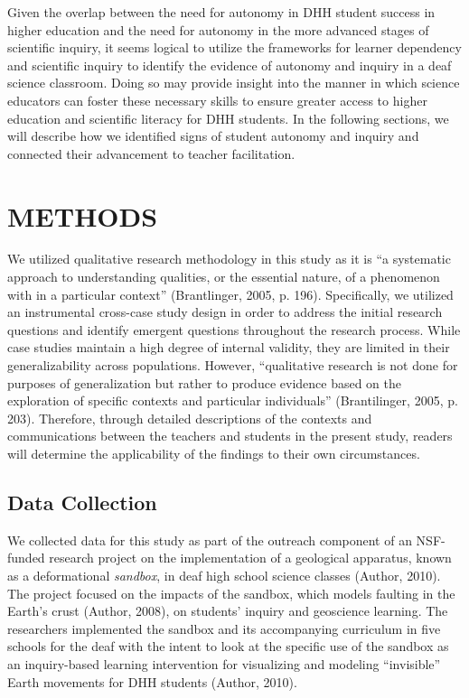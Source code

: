 \documentclass[11.5pt]{sig-alternate} %
\begin{document}
\begin{large}
Given the overlap between the need for autonomy in DHH student success in higher education and the need for autonomy in the more advanced stages of scientific inquiry, it seems logical to utilize the frameworks for learner dependency and scientific inquiry to identify the evidence of autonomy and inquiry in a deaf science classroom.  Doing so may provide insight into the manner in which science educators can foster these necessary skills to ensure greater access to higher education and scientific literacy for DHH students.  In the following sections, we will describe how we identified signs of student autonomy and inquiry and connected their advancement to teacher facilitation. 

\section*{METHODS}

We utilized qualitative research methodology in this study as it is “a systematic approach to understanding qualities, or the essential nature, of a phenomenon with in a particular context” (Brantlinger, 2005, p. 196).  Specifically, we utilized an instrumental cross-case study design in order to address the initial research questions and identify emergent questions throughout the research process.  While case studies maintain a high degree of internal validity, they are limited in their generalizability across populations. However, “qualitative research is not done for purposes of generalization but rather to produce evidence based on the exploration of specific contexts and particular individuals” (Brantilinger, 2005, p. 203).  Therefore, through detailed descriptions of the contexts and communications between the teachers and students in the present study, readers will determine the applicability of the findings to their own circumstances. 

\subsection*{Data Collection}

We collected data for this study as part of the outreach component of an NSF-funded research project on the implementation of a geological apparatus, known as a deformational \textit{sandbox}, in deaf high school science classes (Author, 2010).  The project focused on the impacts of the sandbox, which models faulting in the Earth’s crust (Author, 2008), on students’ inquiry and geoscience learning.  The researchers implemented the sandbox and its accompanying curriculum in five schools for the deaf with the intent to look at the specific use of the sandbox as an inquiry-based learning intervention for visualizing and modeling “invisible” Earth movements for DHH students (Author, 2010).  


\end{large}
\end{document}

